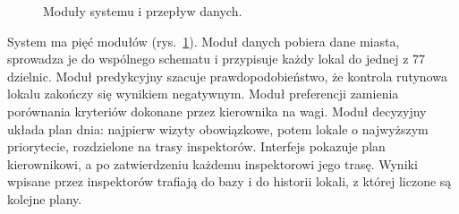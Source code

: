 \documentclass[11pt,a4paper]{article}
\begin{document}
\begin{figure}[ht]
\centering
{}
\caption{Moduły systemu i przepływ danych.}
\label{fig:arch}
\end{figure}

System ma pięć modułów (rys.~\ref{fig:arch}). Moduł danych pobiera dane miasta, sprowadza je do
wspólnego schematu i przypisuje każdy lokal do jednej z 77 dzielnic. Moduł predykcyjny szacuje
prawdopodobieństwo, że kontrola rutynowa lokalu zakończy się wynikiem negatywnym. Moduł
preferencji zamienia porównania kryteriów dokonane przez kierownika na wagi. Moduł decyzyjny
układa plan dnia: najpierw wizyty obowiązkowe, potem lokale o najwyższym priorytecie,
rozdzielone na trasy inspektorów. Interfejs pokazuje plan kierownikowi, a po zatwierdzeniu
każdemu inspektorowi jego trasę. Wyniki wpisane przez inspektorów trafiają do bazy i do historii
lokali, z której liczone są kolejne plany.
\end{document}
